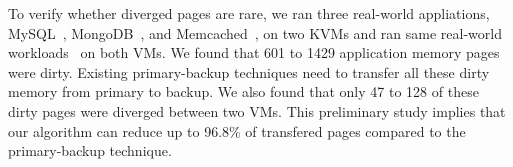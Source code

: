 To verify whether diverged pages are rare, we ran three real-world appliations, 
MySQL~\cite{mysql}, MongoDB~\cite{mongodb}, and Memcached~\cite{memcached}, on 
two KVMs and ran same real-world workloads~\cite{sysbench} on both VMs. 
We found that 601 to 1429 application memory pages were dirty. Existing 
primary-backup techniques need to transfer all these dirty memory from primary 
to backup. We also found that only 47 to 128 of these dirty pages were 
diverged between two VMs. This preliminary study implies that our algorithm can 
reduce up to 96.8\% of transfered pages compared to the primary-backup 
technique.





